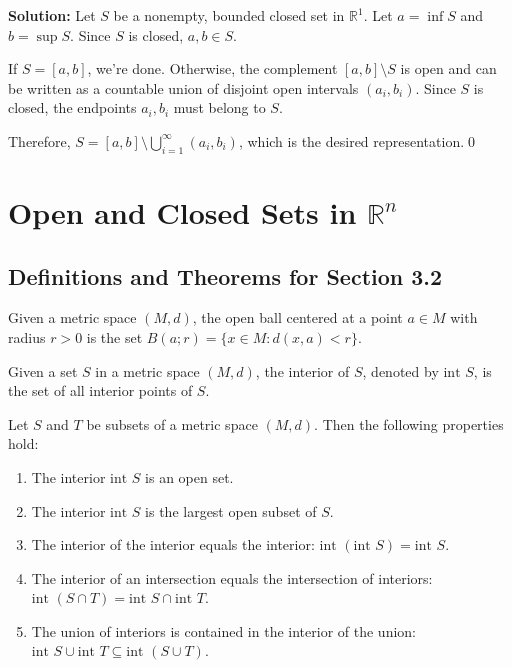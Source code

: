 \bigskip\noindent\textbf{Solution:} Let $S$ be a nonempty, bounded closed set in $\mathbb{R}^1$. Let $a = \inf S$ and $b = \sup S$. Since $S$ is closed, $a, b \in S$.

If $S = [a,b]$, we're done. Otherwise, the complement $[a,b] \setminus S$ is open and can be written as a countable union of disjoint open intervals $(a_i, b_i)$. Since $S$ is closed, the endpoints $a_i, b_i$ must belong to $S$.

Therefore, $S = [a,b] \setminus \bigcup_{i=1}^{\infty} (a_i, b_i)$, which is the desired representation.\qed
\section{Open and Closed Sets in $\mathbb{R}^n$}

\subsection*{Definitions and Theorems for Section 3.2}

\begin{definition}
Given a metric space $(M,d)$, the open ball centered at a point $a \in M$ with radius $r > 0$ is the set $B(a;r) = \{x \in M : d(x,a) < r\}$.
\end{definition}

\begin{definition}
Given a set $S$ in a metric space $(M,d)$, the interior of $S$, denoted by $\text{int } S$, is the set of all interior points of $S$.
\end{definition}

\begin{theorem}
Let $S$ and $T$ be subsets of a metric space $(M,d)$. Then the following properties hold:
\begin{enumerate}
\item The interior $\text{int } S$ is an open set.
\item The interior $\text{int } S$ is the largest open subset of $S$.
\item The interior of the interior equals the interior: $\text{int }(\text{int } S) = \text{int } S$.
\item The interior of an intersection equals the intersection of interiors: $\text{int }(S \cap T) = \text{int } S \cap \text{int } T$.
\item The union of interiors is contained in the interior of the union: $\text{int } S \cup \text{int } T \subseteq \text{int }(S \cup T)$.
\end{enumerate}
\end{theorem}

